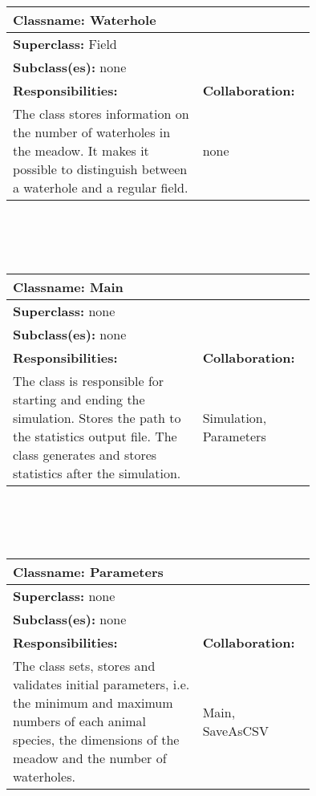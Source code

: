\documentclass{article}
\begin{document}
\\ \\ \\
\begin{tabular}{|p{0.55\linewidth}|p{0.2\linewidth}|}
\hline
\multicolumn{2}{|l|}{\textbf{Classname:} Waterhole} \\
\hline
\multicolumn{2}{|l|}{\textbf{Superclass:} Field} \\
\multicolumn{2}{|l|}{\textbf{Subclass(es):} none} \\
\hline
\textbf{Responsibilities:}  &  \textbf{Collaboration:} \\
The class stores information on the number of waterholes in the meadow. It makes it possible to distinguish between a waterhole and a regular field. & none \\
\hline
\end{tabular}
\\ \\ \\
\begin{tabular}{|p{0.55\linewidth}|p{0.2\linewidth}|}
\hline
\multicolumn{2}{|l|}{\textbf{Classname:} Main} \\
\hline
\multicolumn{2}{|l|}{\textbf{Superclass:} none} \\
\multicolumn{2}{|l|}{\textbf{Subclass(es):} none} \\
\hline
\textbf{Responsibilities:}  &  \textbf{Collaboration:} \\
The class is responsible for starting and ending the simulation. Stores the path to the statistics output file. The class generates and stores statistics after the simulation. & Simulation, Parameters\\
\hline
\end{tabular}
\\ \\ \\
\begin{tabular}{|p{0.55\linewidth}|p{0.2\linewidth}|}
\hline
\multicolumn{2}{|l|}{\textbf{Classname:} Parameters} \\
\hline
\multicolumn{2}{|l|}{\textbf{Superclass:} none} \\
\multicolumn{2}{|l|}{\textbf{Subclass(es):} none} \\
\hline
\textbf{Responsibilities:}  &  \textbf{Collaboration:} \\
The class sets, stores and validates initial parameters, i.e. the minimum and maximum numbers of each animal species, the dimensions of the meadow and the number of waterholes. & Main, SaveAsCSV\\
\hline
\end{tabular}
\end{document}

